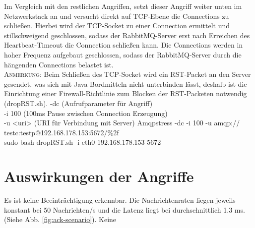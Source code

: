 \documentclass[	a4paper,
			11pt,
			oneside,
			parskip]{scrartcl}
\begin{document}
		{%
		 Im Vergleich mit den restlichen Angriffen, setzt dieser Angriff weiter unten im Netzwerkstack an und versucht direkt auf TCP-Ebene die Connections zu schließen. Hierbei wird der TCP-Socket zu einer 
		 Connection ermittelt und stillschweigend geschlossen, sodass der RabbitMQ-Server erst nach Erreichen des Heartbeat-Timeout die Connection schließen kann. Die Connections werden in hoher Frequenz aufgebaut
		 geschlossen, sodass der RabbitMQ-Server durch die hängenden Connections belastet ist.\\
		 \textsc{Anmerkung:} Beim Schließen des TCP-Socket wird ein RST-Packet an den Server gesendet, was sich mit Java-Bordmitteln nicht unterbinden lässt, deshalb ist die Einrichtung einer Firewall-Richtlinie zum
		 Blocken der RST-Packeten notwendig (dropRST.sh).
		}{%
		 -dc (Aufrufparameter für Angriff) \\
		 -i 100 (100ms Pause zwischen Connection Erzeugung) \\
		 -u <uri> (URI für Verbindung mit Server)
		}{%
		 Amqpstress -dc -i 100 -u amqp://\\\hspace*{3cm}testc:testp@192.168.178.153:5672/\%2f\\
		 sudo bash dropRST.sh -i eth0 192.168.178.153 5672
		}
	


%	
%
\clearpage
\section*{Auswirkungen der Angriffe}
	
		{%
		  \newline
		  \newline
		  \newline
		}{%
		 Es ist keine Beeinträchtigung erkennbar. Die Nachrichtenraten liegen jeweils konstant bei 50 Nachrichten/s und die Latenz liegt bei durchschnittlich 1.3 ms.
		 (Siehe Abb. \ref{fig:ack-scenario}).
		}{%
		 Keine
		}
		
\end{document}
